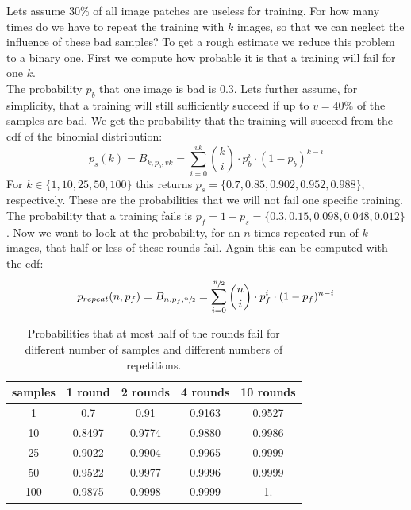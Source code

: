 Lets assume 30\% of all image patches are useless for training. For how many times do we have to repeat the training with $k$ images, so that we can neglect the influence of these bad samples? To get a rough estimate we reduce this problem to a binary one. First we compute how probable it is that a training will fail for one $k$.\\
The probability $p_b$ that one image is bad is $0.3$. Lets further assume, for simplicity, that a training will still sufficiently succeed if up to $v = 40\%$ of the samples are bad. We get the probability that the training will succeed from the \gls{cdf} of the binomial distribution:
\begin{equation}
    p_s(k) = B_{k,p_b, v k} = \sum_{i=0}^{v k} \binom{k}{i}\cdot p_b^i \cdot (1 - p_b)^{k - i}
\end{equation}
For $k\in\{1, 10, 25, 50, 100\}$ this returns $p_s = \{\num{0.7},\num{0.85},\num{0.902},\num{0.952},\num{0.988}\}$, respectively. These are the probabilities that we will not fail one specific training. The probability that a training fails is $p_f = 1 - p_s = \{\num{0.3},\num{0.15},\num{0.098},\num{0.048},\num{0.012}\}$. Now we want to look at the probability, for an $n$ times repeated run of $k$ images, that half or less of these rounds fail. Again this can be computed with the \gls{cdf}:
\begin{equation}
    p_{repeat}(n,p_f) = B_{n,p_f, \sfrac{n}{2}} = \sum_{i=0}^{\sfrac{n}{2}} \binom{n}{i}\cdot p_f^i \cdot (1 - p_f)^{n - i}
\end{equation}

\begin{table}
	\begin{center}
            \begin{tabular}{c|*{4}{c}}
                samples & 1 round & 2 rounds & 4 rounds & 10 rounds \\ \hline \rule{0pt}{3ex}
                1   & 0.7    &  0.91   &  0.9163 &  0.9527 \\
                10  & 0.8497 &  0.9774 &  0.9880 &  0.9986 \\
                25  & 0.9022 &  0.9904 &  0.9965 &  0.9999  \\
                50  & 0.9522 &  0.9977 &  0.9996 &  0.9999 \\
                100 & 0.9875 &  0.9998 &  0.9999 &  1.
            \end{tabular}
	\end{center}
    \caption{Probabilities that at most half of the rounds fail for different number of samples and different numbers of repetitions.}
    \label{tab:repeated_test_probs}
\end{table}

